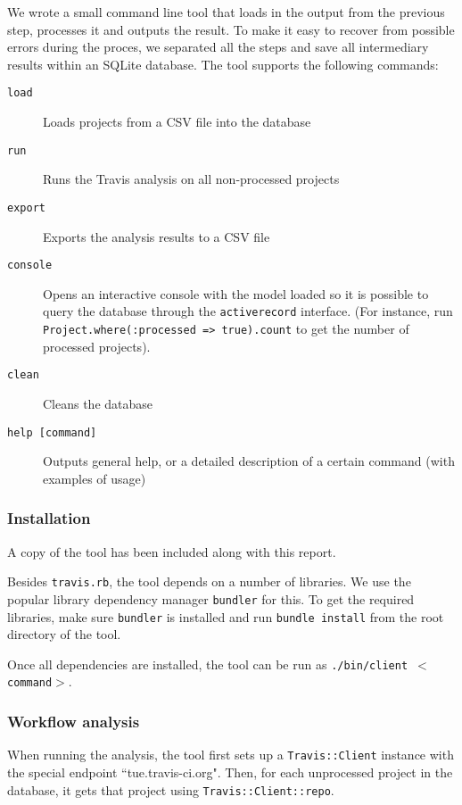 We wrote a small command line tool that loads in the output from the previous step, processes it and outputs the result.
To make it easy to recover from possible errors during the proces, we separated all the steps and save all intermediary results within an SQLite database.
The tool supports the following commands:

\begin{description}
	\item[\texttt{load}] Loads projects from a CSV file into the database
	\item[\texttt{run}] Runs the Travis analysis on all non-processed projects
	\item[\texttt{export}] Exports the analysis results to a CSV file
	\item[\texttt{console}] Opens an interactive console with the model loaded so it is possible to query the database through the \texttt{activerecord} interface. (For instance, run \texttt{Project.\-where(:processed => true).\-count} to get the number of processed projects).
	\item[\texttt{clean}] Cleans the database
	\item[\texttt{help [command]}] Outputs general help, or a detailed description of a certain command (with examples of usage)
\end{description}

	\subsubsection{Installation}
	A copy of the tool has been included along with this report.
	
	Besides \texttt{travis.rb}, the tool depends on a number of libraries.
	We use the popular library dependency manager \texttt{bundler} for this.
	To get the required libraries, make sure \texttt{bundler} is installed and run \texttt{bundle install} from the root directory of the tool.
	
	Once all dependencies are installed, the tool can be run as \texttt{./bin/client $<$command$>$}.

	\subsubsection{Workflow analysis}
	When running the analysis, the tool first sets up a \texttt{Travis::Client} instance with the special endpoint ``tue.travis-ci.org".
	Then, for each unprocessed project in the database, it gets that project using \texttt{Travis::Client::repo}.
	
